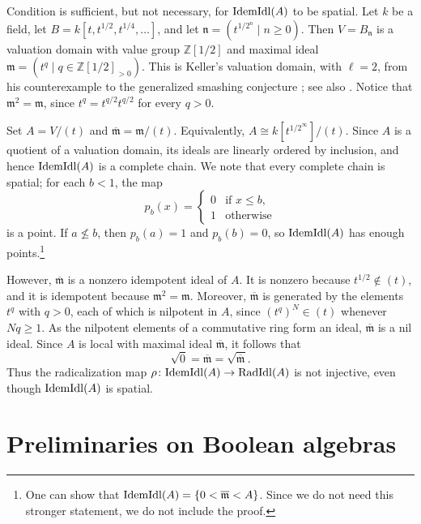 \documentclass{amsart}
\begin{document}
    \begin{Rem}
      Condition  is sufficient, but not necessary, for $\mathrm{IdemIdl}(A)$ to be spatial. Let $k$ be a field, let $B=k[t,t^{1/2},t^{1/4},\ldots]$, and let $\mathfrak n=(t^{1/2^n}\mid n\ge 0)$. Then $V=B_{\mathfrak n}$ is a valuation domain with value group $\mathbb Z[1/2]$ and maximal ideal $\mathfrak m=(t^q\mid q\in\mathbb Z[1/2]_{>0})$. This is Keller's valuation domain, with $\ell = 2$, from his counterexample to the generalized smashing conjecture \cite[Section 2]{Keller1994Remark}; see also \cite[Example 5.24]{BazzonivStovivcek2017Smashing}. Notice that $\mathfrak m^2=\mathfrak m$, since $t^q=t^{q/2}t^{q/2}$ for every $q>0$.
    
        Set $A=V/(t)$ and $\overline{\mathfrak m}=\mathfrak m/(t)$. Equivalently, $A\cong k[t^{1/2^\infty}]/(t)$. Since $A$ is a quotient of a valuation domain, its ideals are linearly ordered by inclusion, and hence $\mathrm{IdemIdl}(A)$ is a complete chain. We note that every complete chain is spatial; for each $b<1$, the map
        \[
            p_b(x)=
            \begin{cases}
                0 & \text{if }x\le b,\\
                1 & \text{otherwise}
            \end{cases}
        \]
        is a point. If $a\nleq b$, then $p_b(a)=1$ and $p_b(b)=0$, so $\mathrm{IdemIdl}(A)$ has enough points.\footnote{One can show that $\mathrm{IdemIdl}(A)=\{0<\overline{\mathfrak m}<A\}$. Since we do not need this stronger statement, we do not include the proof.}
    
         However, $\overline{\mathfrak m}$ is a nonzero idempotent ideal of $A$. It is nonzero because $t^{1/2}\notin(t)$, and it is idempotent because $\mathfrak m^2=\mathfrak m$. Moreover, $\overline{\mathfrak m}$ is generated by the elements $t^q$ with $q>0$, each of which is nilpotent in $A$, since $(t^q)^N\in(t)$ whenever $Nq\ge 1$. As the nilpotent elements of a commutative ring form an ideal, $\overline{\mathfrak m}$ is a nil ideal. Since $A$ is local with maximal ideal $\overline{\mathfrak m}$, it follows that
        \[
            \sqrt{0}=\overline{\mathfrak m}=\sqrt{\overline{\mathfrak m}}.
        \]
        Thus the radicalization map $\rho \colon \mathrm{IdemIdl}(A) \to \operatorname{RadIdl}(A)$ is not injective, even though $\mathrm{IdemIdl}(A)$ is spatial.
    \end{Rem}
    \section{Preliminaries on Boolean algebras}\label{sec:boolean}
    
\end{document}
